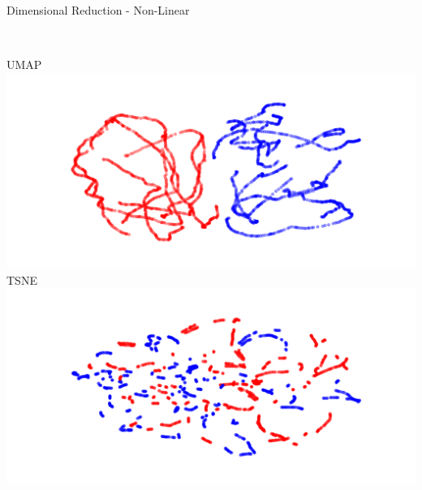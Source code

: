 \documentclass[t, 11pt, xcolor=dvipsnames]{beamer}
\begin{document}
\begin{frame}[fragile]{Dimensional Reduction - Non-Linear}
{\begin{center}
\begin{minipage}{0.47\textwidth}
		  \end{minipage}
			~
		  \begin{minipage}{0.47\textwidth}
	          UMAP\\
                  \includegraphics[width=1\textwidth]{images/dimredcomps/UMAP_gt.png}\\
		  TSNE\\
                  \includegraphics[width=1\textwidth]{images/dimredcomps/TSNE_gt.png}\\
		  \end{minipage}
	\end{center}}
\end{frame}
\end{document}
